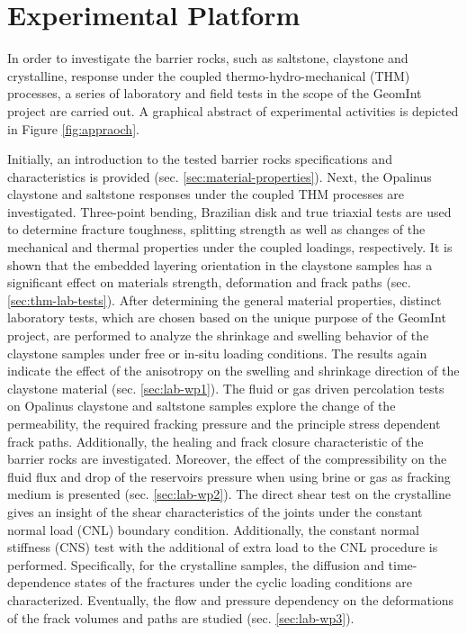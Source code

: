 \chapter{Experimental Platform}
\label{cha:exp}

In order to investigate the barrier rocks, such as saltstone, claystone and crystalline, response under the coupled thermo-hydro-mechanical (THM) processes, a series of laboratory and field tests in the scope of the GeomInt project are carried out. A graphical abstract of experimental activities is depicted in Figure \ref{fig:appraoch}.

Initially, an introduction to the tested barrier rocks specifications and characteristics is provided (sec. \ref{sec:material-properties}). Next, the Opalinus claystone and saltstone responses under the coupled THM processes are investigated. Three-point bending, Brazilian disk and true triaxial tests are used to determine fracture toughness, splitting strength as well as changes of the mechanical and thermal properties under the coupled loadings, respectively. It is shown that the embedded layering orientation in the claystone samples has a significant effect on materials strength, deformation and frack paths (sec. \ref{sec:thm-lab-tests}).
%
After determining the general material properties, distinct laboratory tests, which are chosen based on the unique purpose of the GeomInt project, are performed to analyze the shrinkage and swelling behavior of the claystone samples under free or in-situ loading conditions. The results again indicate the effect of the anisotropy on the swelling and shrinkage direction of the claystone material (sec. \ref{sec:lab-wp1}). 
%
The fluid or gas driven percolation tests on Opalinus claystone and saltstone samples explore the change of the permeability, the required fracking pressure and the principle stress dependent frack paths. Additionally, the healing and frack closure characteristic of the barrier rocks are investigated. Moreover, the effect of the compressibility on the fluid flux and drop of the reservoirs pressure when using brine or gas as fracking medium is presented (sec. \ref{sec:lab-wp2}).
%
The direct shear test on the crystalline gives an insight of the shear characteristics of the joints under the constant normal load (CNL) boundary condition. Additionally, the constant normal stiffness (CNS) test with the additional of extra load to the CNL procedure is performed. Specifically, for the crystalline samples, the diffusion and time-dependence states of the fractures under the cyclic loading conditions are characterized. Eventually, the flow and pressure dependency on the deformations of the frack volumes and paths are studied (sec. \ref{sec:lab-wp3}).

